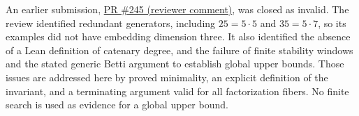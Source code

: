 \documentclass[11pt]{article}
\begin{document}
An earlier submission,
\href{https://github.com/The-Last-Math-Competition/The-Last-Math-Competition/pull/245\#issuecomment-5965086293}{PR \#245 (reviewer comment)},
was closed as invalid. The review identified redundant generators,
including $25=5\cdot5$ and $35=5\cdot7$, so its examples did not have
embedding dimension three. It also identified the absence of a Lean
definition of catenary degree, and the failure of finite stability windows
and the stated generic Betti argument to establish global upper bounds.
Those issues are addressed here by proved minimality, an explicit definition
of the invariant, and a terminating argument valid for all factorization
fibers. No finite search is used as evidence for a global upper bound.
\end{document}
